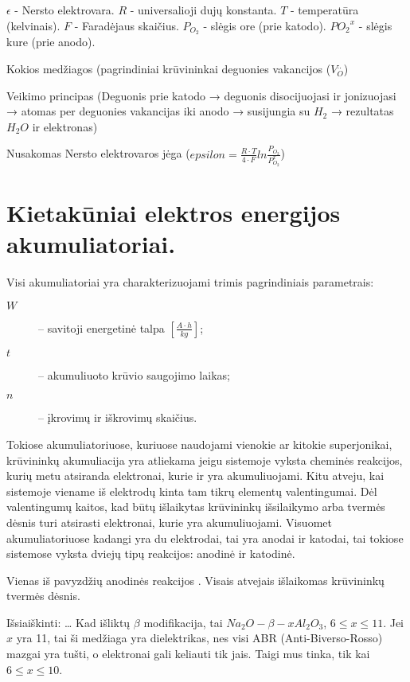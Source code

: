 $\epsilon$ - Nersto elektrovara.
$R$ - universalioji dujų konstanta.
$T$ - temperatūra (kelvinais).
$F$ - Faradėjaus skaičius.
$P_{O_2}$ - slėgis ore (prie katodo).
$P{O_2}^x$ - slėgis kure (prie anodo).

\begin{remember}
  \item Kokios medžiagos (pagrindiniai krūvininkai deguonies vakancijos
  ($V_{O}^{..}$) 
  \item Veikimo principas (Deguonis prie katodo → deguonis
  disocijuojasi ir jonizuojasi →  atomas per deguonies vakancijas
  iki anodo → susijungia su $H_2$ → rezultatas $H_2 O$ ir elektronas)
  \item Nusakomas Nersto elektrovaros jėga
  ($epsilon = \frac{R \cdot T}{4 \cdot F}ln \frac{P_{O_2}}{P_{O_2}^x}$)
\end{remember}

\section{Kietakūniai elektros energijos akumuliatoriai.}

Visi akumuliatoriai yra charakterizuojami trimis pagrindiniais parametrais:
\begin{description}
  \item[$W$]  – savitoji energetinė talpa
    $\left[ \frac{A \cdot h}{kg} \right]$;
  \item[$t$] – akumuliuoto krūvio saugojimo laikas;
  \item[$n$] – įkrovimų ir iškrovimų skaičius.
\end{description}

Tokiose akumuliatoriuose, kuriuose naudojami vienokie ar kitokie
superjonikai, krūvininkų akumuliacija yra atliekama jeigu sistemoje
vyksta cheminės reakcijos, kurių metu atsiranda elektronai, kurie
ir yra akumuliuojami. Kitu atveju, kai sistemoje viename iš
elektrodų kinta tam tikrų elementų valentingumai. Dėl valentingumų
kaitos, kad būtų išlaikytas krūvininkų išsilaikymo arba tvermės
dėsnis turi atsirasti elektronai, kurie yra akumuliuojami.
Visuomet akumuliatoriuose kadangi yra du elektrodai, tai yra anodai
ir katodai, tai tokiose sistemose vyksta dviejų tipų reakcijos:
anodinė ir katodinė.

Vienas iš pavyzdžių anodinės reakcijos .
Visais atvejais išlaikomas krūvininkų tvermės dėsnis.

Išsiaiškinti:
…
Kad išliktų $\beta$ modifikacija, tai $Na_{2}O-\beta-x Al_{2}O_{3}$,
$6 \leq x \leq 11$. Jei $x$ yra 11, tai ši medžiaga yra dielektrikas,
nes visi ABR (Anti-Biverso-Rosso) mazgai yra tušti, o elektronai gali
keliauti tik jais. Taigi mus tinka, tik kai $6 \leq x \leq 10$.

